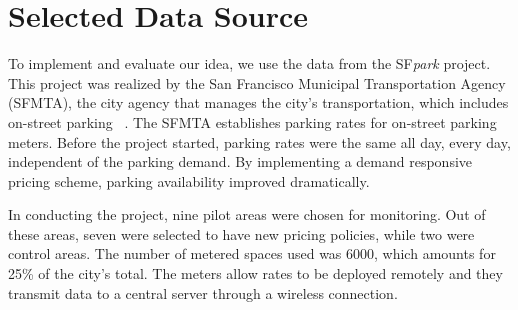 \section{Selected Data Source}
To implement and evaluate our idea, we use the data from the SF\textit{park} project. This project was realized by the San Francisco Municipal Transportation Agency (SFMTA), the city agency that manages the city's transportation, which includes on-street parking~\cite{sfpark} \cite{sfpark_evaluation}. The SFMTA establishes parking rates for on-street parking meters. Before the project started, parking rates were the same all day, every day, independent of the parking demand. By implementing a demand responsive pricing scheme, parking availability improved dramatically. 


In conducting the project, nine pilot areas were chosen for monitoring. Out of these areas, seven were selected to have new pricing policies, while two were control areas. The number of metered spaces used was 6000, which amounts for 25\% of the city's total. The meters allow rates to be deployed remotely and they transmit data to a central server through a wireless connection.

